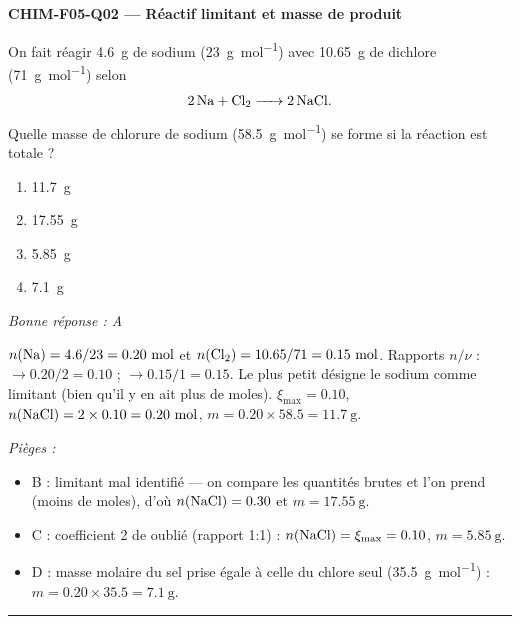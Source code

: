 \documentclass[11pt,a4paper]{article}
\begin{document}
\noindent\textbf{CHIM-F05-Q02 --- Réactif limitant et masse de produit}\par
On fait réagir \qty{4.6}{\gram} de sodium (\qty{23}{\gram\per\mole}) avec \qty{10.65}{\gram} de dichlore (\qty{71}{\gram\per\mole}) selon
\[\ce{2 Na + Cl2 -> 2 NaCl}.\]
Quelle masse de chlorure de sodium (\qty{58.5}{\gram\per\mole}) se forme si la réaction est totale ?
\begin{enumerate}[label=\Alph*)]
\item \qty{11.7}{\gram}
\item \qty{17.55}{\gram}
\item \qty{5.85}{\gram}
\item \qty{7.1}{\gram}
\end{enumerate}
\textit{Bonne réponse : A}\par
$n(\ce{Na})=\num{4.6}/\num{23}=\num{0.20}~\si{\mole}$ et $n(\ce{Cl2})=\num{10.65}/\num{71}=\num{0.15}~\si{\mole}$. Rapports $n/\nu$ :  $\to\num{0.20}/\num{2}=\num{0.10}$ ;  $\to\num{0.15}/\num{1}=\num{0.15}$. Le plus petit désigne le sodium comme limitant (bien qu'il y en ait plus de moles). $\xi_{\max}=\num{0.10}$, $n(\ce{NaCl})=\num{2}\times\num{0.10}=\num{0.20}~\si{\mole}$, $m=\num{0.20}\times\num{58.5}=\qty{11.7}{\gram}$.\par
\textit{Pièges :}
\begin{itemize}
\item B : limitant mal identifié — on compare les quantités brutes et l'on prend  (moins de moles), d'où $n(\ce{NaCl})=\num{0.30}$ et $m=\qty{17.55}{\gram}$.
\item C : coefficient \num{2} de  oublié (rapport \num{1}:\num{1}) : $n(\ce{NaCl})=\xi_{\max}=\num{0.10}$, $m=\qty{5.85}{\gram}$.
\item D : masse molaire du sel prise égale à celle du chlore seul (\qty{35.5}{\gram\per\mole}) : $m=\num{0.20}\times\num{35.5}=\qty{7.1}{\gram}$.
\end{itemize}
\vspace{6pt}\hrule\vspace{8pt}
\end{document}
